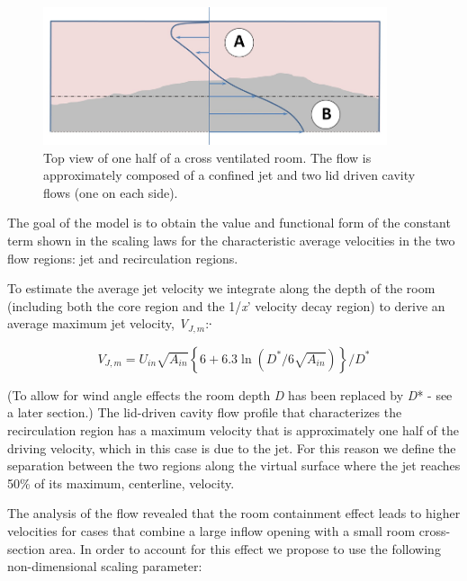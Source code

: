 {\begin{figure}[hbtp] %
\centering
\includegraphics[width=0.9\textwidth, height=0.9\textheight, keepaspectratio=true]{media/image2624.png}
\caption{Top view of one half of a cross ventilated room. The flow is approximately composed of a confined jet and two lid driven cavity flows (one on each side). \protect \label{fig:top-view-of-one-half-of-a-cross-ventilated}}
\end{figure}

The goal of the model is to obtain the value and functional form of the constant term shown in the scaling laws for the characteristic average velocities in the two flow regions: jet and recirculation regions.

To estimate the average jet velocity we integrate along the depth of the room (including both the core region and the 1/\emph{x}' velocity decay region) to derive an average maximum jet velocity, \emph{V}\(_{J,m}\):∙

\begin{equation}
{V_{J,m}} = {U_{in}}\sqrt {{A_{in}}} \left\{ {6 + 6.3\ln \left( {{D^*}/6\sqrt {{A_{in}}} } \right)} \right\}/{D^*}
\end{equation}

(To allow for wind angle effects the room depth \emph{D} has been replaced by \emph{D}* - see a later section.) The lid-driven cavity flow profile that characterizes the recirculation region has a maximum velocity that is approximately one half of the driving velocity, which in this case is due to the jet. For this reason we define the separation between the two regions along the virtual surface where the jet reaches 50\% of its maximum, centerline, velocity.

The analysis of the flow revealed that the room containment effect leads to higher velocities for cases that combine a large inflow opening with a small room cross-section area. In order to account for this effect we propose to use the following non-dimensional scaling parameter:

}
